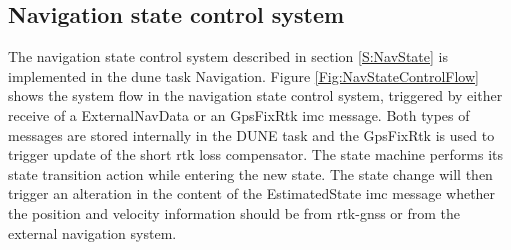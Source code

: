 \subsection{Navigation state control system}
The navigation state control system described in section \ref{S:NavState} is implemented in the \gls{dune} task Navigation. Figure \ref{Fig:NavStateControlFlow} shows the system flow in the navigation state control system, triggered by either receive of a ExternalNavData or an GpsFixRtk \gls{imc} message. Both types of messages are stored internally in the DUNE task and the GpsFixRtk is used to trigger update of the short rtk loss compensator. The state machine performs its state transition action while entering the new state. The state change will then trigger an alteration in the content of the EstimatedState \gls{imc} message whether the position and velocity information should be from \gls{rtk-gnss} or from the external navigation system.

